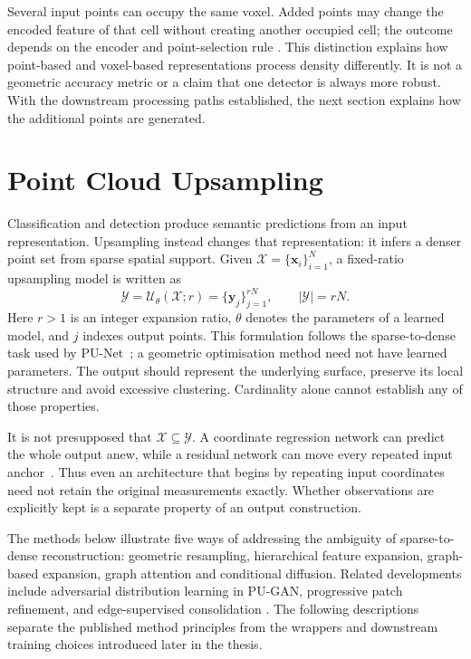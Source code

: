 Several input points can occupy the same voxel. Added points may change
the encoded feature of that cell without creating another occupied cell;
the outcome depends on the encoder and point-selection rule
\cite{zhou2018voxelnet}. This distinction explains how point-based and
voxel-based representations process density differently. It is not a
geometric accuracy metric or a claim that one detector is always more
robust. With the downstream processing paths established, the next section
explains how the additional points are generated.

\FloatBarrier
\section{Point Cloud Upsampling}
\label{sec:upsampling}

Classification and detection produce semantic predictions from an input
representation. Upsampling instead changes that representation: it infers
a denser point set from sparse spatial support. Given
$\mathcal X=\{\mathbf x_i\}_{i=1}^N$, a fixed-ratio upsampling model is
written as
\begin{equation}
 \mathcal Y=\mathcal U_\theta(\mathcal X;r)
 =\{\mathbf y_j\}_{j=1}^{rN},\qquad |\mathcal Y|=rN.
 \label{eq:upsampling_map}
\end{equation}
Here $r>1$ is an integer expansion ratio, $\theta$ denotes the parameters
of a learned model, and $j$ indexes output points. This formulation follows
the sparse-to-dense task used by PU-Net~\cite{yu2018punet}; a geometric
optimisation method need not have learned parameters. The output should
represent the underlying surface, preserve its local structure and avoid
excessive clustering. Cardinality alone cannot establish any of those
properties.

It is not presupposed that $\mathcal X\subseteq\mathcal Y$. A coordinate
regression network can predict the whole output anew, while a residual
network can move every repeated input anchor~\cite{yu2018punet,kim2023puedgeformer}.
Thus even an architecture that begins by repeating input coordinates need
not retain the original measurements exactly. Whether observations are
explicitly kept is a separate property of an output construction.

The methods below illustrate five ways of addressing the ambiguity of
sparse-to-dense reconstruction: geometric resampling, hierarchical feature
expansion, graph-based expansion, graph attention and conditional diffusion.
Related developments include adversarial distribution learning in PU-GAN,
progressive patch refinement, and edge-supervised consolidation
\cite{li2019pugan,wang2019mpu,yu2018ecnet}. The following descriptions
separate the published method principles from the wrappers and downstream
training choices introduced later in the thesis.

